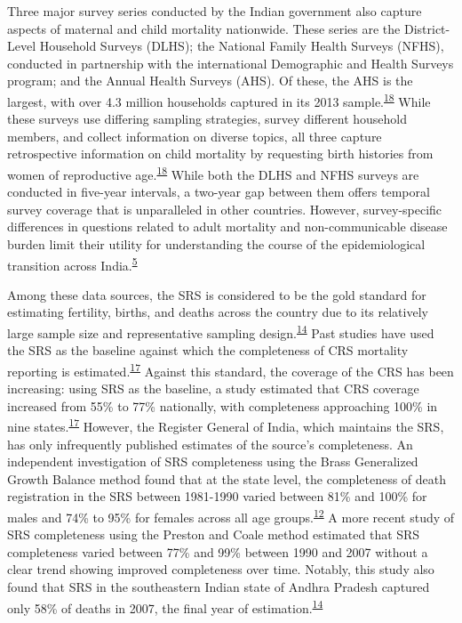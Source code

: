 \documentclass[
]{article}
\begin{document}
Three major survey series conducted by the Indian government also capture aspects of maternal and child mortality nationwide. These series are the District-Level Household Surveys (DLHS); the National Family Health Surveys (NFHS), conducted in partnership with the international Demographic and Health Surveys program; and the Annual Health Surveys (AHS). Of these, the AHS is the largest, with over 4.3 million households captured in its 2013 sample.\textsuperscript{\protect\hyperlink{ref-Dandona2016}{18}} While these surveys use differing sampling strategies, survey different household members, and collect information on diverse topics, all three capture retrospective information on child mortality by requesting birth histories from women of reproductive age.\textsuperscript{\protect\hyperlink{ref-Dandona2016}{18}} While both the DLHS and NFHS surveys are conducted in five-year intervals, a two-year gap between them offers temporal survey coverage that is unparalleled in other countries. However, survey-specific differences in questions related to adult mortality and non-communicable disease burden limit their utility for understanding the course of the epidemiological transition across India.\textsuperscript{\protect\hyperlink{ref-Yadav2014}{5}}

Among these data sources, the SRS is considered to be the gold standard for estimating fertility, births, and deaths across the country due to its relatively large sample size and representative sampling design.\textsuperscript{\protect\hyperlink{ref-Mahapatra2010}{14}} Past studies have used the SRS as the baseline against which the completeness of CRS mortality reporting is estimated.\textsuperscript{\protect\hyperlink{ref-Kumar2019}{17}} Against this standard, the coverage of the CRS has been increasing: using SRS as the baseline, a study estimated that CRS coverage increased from 55\% to 77\% nationally, with completeness approaching 100\% in nine states.\textsuperscript{\protect\hyperlink{ref-Kumar2019}{17}} However, the Register General of India, which maintains the SRS, has only infrequently published estimates of the source's completeness. An independent investigation of SRS completeness using the Brass Generalized Growth Balance method found that at the state level, the completeness of death registration in the SRS between 1981-1990 varied between 81\% and 100\% for males and 74\% to 95\% for females across all age groups.\textsuperscript{\protect\hyperlink{ref-Bhat2002}{12}} A more recent study of SRS completeness using the Preston and Coale method estimated that SRS completeness varied between 77\% and 99\% between 1990 and 2007 without a clear trend showing improved completeness over time. Notably, this study also found that SRS in the southeastern Indian state of Andhra Pradesh captured only 58\% of deaths in 2007, the final year of estimation.\textsuperscript{\protect\hyperlink{ref-Mahapatra2010}{14}}
\end{document}
